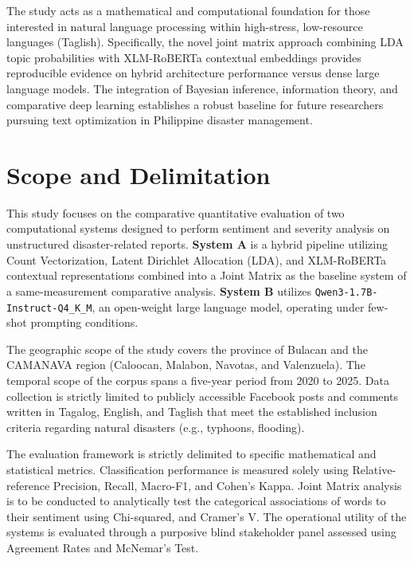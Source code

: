 \documentclass[12pt,a4paper]{report}
\newcommand{\sysA}{\textbf{System A}}
\newcommand{\sysB}{\textbf{System B}}
\newcommand{\qwen}{\texttt{Qwen3-1.7B-Instruct-Q4\_K\_M}}
\newcommand{\xlmr}{XLM-RoBERTa}
\begin{document}
\begin{description}[style=nextline,leftmargin=0pt]
  \item[Researchers and Future Developers.] The study acts as a mathematical
  and computational foundation for those interested in natural language
  processing within high-stress, low-resource languages (Taglish).
  Specifically, the novel joint matrix approach combining LDA topic
  probabilities with \xlmr{} contextual embeddings provides reproducible
  evidence on hybrid architecture performance versus dense large language
  models. The integration of Bayesian inference, information theory, and
  comparative deep learning establishes a robust baseline for future researchers
  pursuing text optimization in Philippine disaster management.
\end{description}

\section{Scope and Delimitation}

This study focuses on the comparative quantitative evaluation of two
computational systems designed to perform sentiment and severity analysis on
unstructured disaster-related reports. \sysA{} is a hybrid pipeline utilizing
Count Vectorization, Latent Dirichlet Allocation (LDA), and \xlmr{}
contextual representations combined into a Joint Matrix as the baseline system
of a same-measurement comparative analysis. \sysB{} utilizes \qwen, an
open-weight large language model, operating under few-shot prompting
conditions.

The geographic scope of the study covers the province of Bulacan and the
CAMANAVA region (Caloocan, Malabon, Navotas, and Valenzuela). The temporal
scope of the corpus spans a five-year period from 2020 to 2025. Data collection
is strictly limited to publicly accessible Facebook posts and comments written
in Tagalog, English, and Taglish that meet the established inclusion criteria
regarding natural disasters (e.g., typhoons, flooding).

The evaluation framework is strictly delimited to specific mathematical and
statistical metrics. Classification performance is measured solely using Relative-reference
Precision, Recall, Macro-F1, and Cohen's Kappa. Joint Matrix analysis is to be
conducted to analytically test the categorical associations of words to their
sentiment using Chi-squared, and Cramer's V. The operational
utility of the systems is evaluated through a purposive blind stakeholder panel
assessed using Agreement Rates and McNemar's Test.
\end{document}
